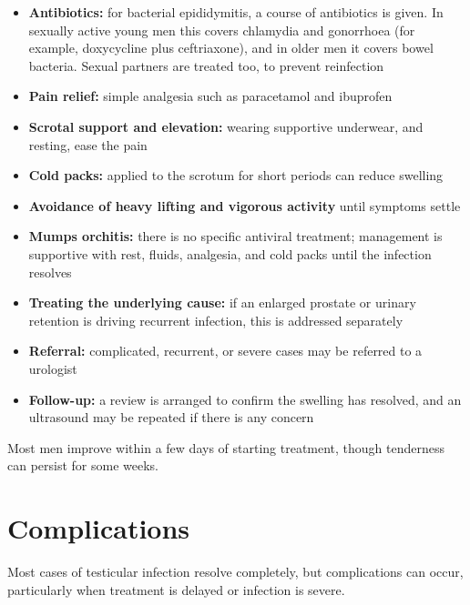 \begin{itemize}
    \item \textbf{Antibiotics:} for bacterial epididymitis, a course of antibiotics is given. In sexually active young men this covers chlamydia and gonorrhoea (for example, doxycycline plus ceftriaxone), and in older men it covers bowel bacteria. Sexual partners are treated too, to prevent reinfection
    \item \textbf{Pain relief:} simple analgesia such as paracetamol and ibuprofen
    \item \textbf{Scrotal support and elevation:} wearing supportive underwear, and resting, ease the pain
    \item \textbf{Cold packs:} applied to the scrotum for short periods can reduce swelling
    \item \textbf{Avoidance of heavy lifting and vigorous activity} until symptoms settle
    \item \textbf{Mumps orchitis:} there is no specific antiviral treatment; management is supportive with rest, fluids, analgesia, and cold packs until the infection resolves
    \item \textbf{Treating the underlying cause:} if an enlarged prostate or urinary retention is driving recurrent infection, this is addressed separately
    \item \textbf{Referral:} complicated, recurrent, or severe cases may be referred to a urologist
    \item \textbf{Follow-up:} a review is arranged to confirm the swelling has resolved, and an ultrasound may be repeated if there is any concern
\end{itemize}

Most men improve within a few days of starting treatment, though tenderness can persist for some weeks.

\section*{Complications}
Most cases of testicular infection resolve completely, but complications can occur, particularly when treatment is delayed or infection is severe.

